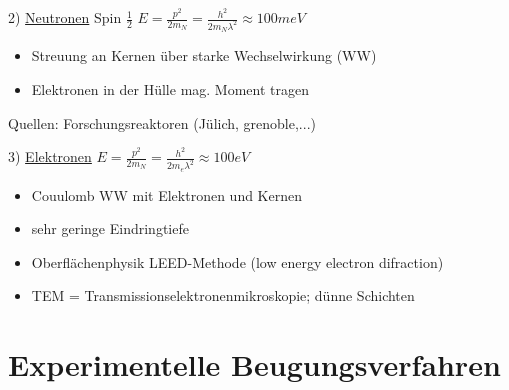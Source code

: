 2) \underline{Neutronen}  Spin \(\frac 1 2\) \(E=\frac {p^2}{2m_N}=\frac
{h^2}{2m_N\lambda^2}\approx 100meV\)

\begin{itemize}
\item Streuung an Kernen über starke Wechselwirkung (WW)
\item Elektronen in der Hülle mag. Moment tragen
\end{itemize}

Quellen: Forschungsreaktoren (Jülich, grenoble,...)

3) \underline{Elektronen} \(E=\frac {p^2}{2m_N}=\frac
{h^2}{2m_e\lambda^2}\approx 100eV\)
\begin{itemize}
\item Couulomb WW mit Elektronen und Kernen
\item sehr geringe Eindringtiefe
\item Oberflächenphysik LEED-Methode (low energy electron difraction)
\item TEM = Transmissionselektronenmikroskopie; dünne Schichten
\end{itemize}


\section{Experimentelle Beugungsverfahren}

